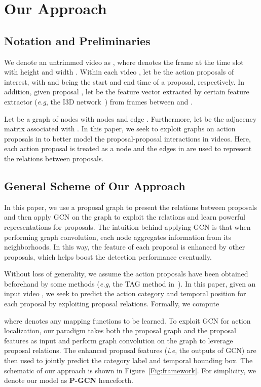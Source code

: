 \documentclass[10pt,twocolumn,letterpaper]{article}
\def\eg{\emph{e.g}\onedot} \def\Eg{\emph{E.g}\onedot}
\def\ie{\emph{i.e}\onedot} \def\Ie{\emph{I.e}\onedot}
\begin{document}
	
	
	\section{Our Approach}\label{Sec:graph}
\subsection{Notation and Preliminaries}
	We denote an untrimmed video as , where  denotes the frame at the time slot  with height  and width .
	Within each video ,  let  be the action proposals of interest, with  and  being the start and end time of a proposal, respectively. In addition, given proposal , let  be the feature vector extracted by certain feature extractor (\eg, the I3D network~\cite{carreira2017quo}) from frames between  and .
	
	Let  be a graph of  nodes with nodes  and edge . Furthermore, let  be the adjacency matrix  associated with .
	In this paper, we seek to exploit graphs  on action proposals in  to better model the proposal-proposal interactions in videos. Here, each action proposal is treated as a node and the edges in  are used to represent the relations between proposals.
	
	\subsection{General Scheme of Our Approach}
	
	In this paper, we use a proposal graph  to present the relations between proposals and then apply GCN on the graph to exploit the relations and learn powerful representations for proposals. The intuition behind applying GCN is that when performing graph convolution, each node aggregates information from its neighborhoods. In this way, the feature of each proposal is enhanced by other proposals, which helps boost the detection performance eventually. 
	
	Without loss of generality, we assume the action proposals have been obtained beforehand by some methods (\eg, the TAG method in~\cite{zhao2017temporal}). In this paper, given an input video , we seek to predict the action category  and temporal position  for each proposal  by exploiting proposal relations. Formally, we compute
	
	where  denotes any mapping functions to be learned. To exploit GCN for action localization, our paradigm takes both the proposal graph and the proposal features as input and perform graph convolution on the graph to leverage proposal relations. The enhanced proposal features (\ie, the outputs of GCN) are then used to jointly predict the category label and temporal bounding box.
	The schematic of our approach is shown in Figure~\ref{Fig:framework}. For simplicity, we denote our model as \textbf{P-GCN} henceforth.
	
\end{document}
